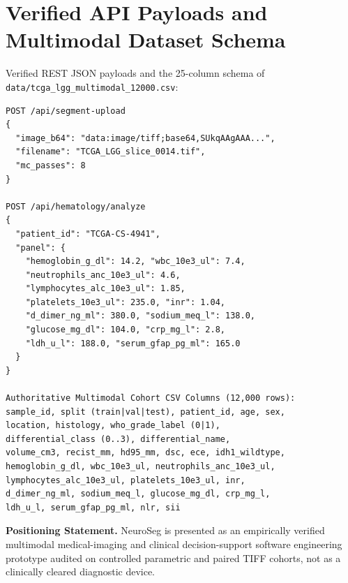\documentclass[journal,onecolumn,10pt]{IEEEtran}
\begin{document}
\section{Verified API Payloads and Multimodal Dataset Schema}
Verified REST JSON payloads and the 25-column schema of \texttt{data/tcga\_lgg\_multimodal\_12000.csv}:
\begin{verbatim}
POST /api/segment-upload
{
  "image_b64": "data:image/tiff;base64,SUkqAAgAAA...",
  "filename": "TCGA_LGG_slice_0014.tif",
  "mc_passes": 8
}

POST /api/hematology/analyze
{
  "patient_id": "TCGA-CS-4941",
  "panel": {
    "hemoglobin_g_dl": 14.2, "wbc_10e3_ul": 7.4,
    "neutrophils_anc_10e3_ul": 4.6,
    "lymphocytes_alc_10e3_ul": 1.85,
    "platelets_10e3_ul": 235.0, "inr": 1.04,
    "d_dimer_ng_ml": 380.0, "sodium_meq_l": 138.0,
    "glucose_mg_dl": 104.0, "crp_mg_l": 2.8,
    "ldh_u_l": 188.0, "serum_gfap_pg_ml": 165.0
  }
}

Authoritative Multimodal Cohort CSV Columns (12,000 rows):
sample_id, split (train|val|test), patient_id, age, sex,
location, histology, who_grade_label (0|1),
differential_class (0..3), differential_name,
volume_cm3, recist_mm, hd95_mm, dsc, ece, idh1_wildtype,
hemoglobin_g_dl, wbc_10e3_ul, neutrophils_anc_10e3_ul,
lymphocytes_alc_10e3_ul, platelets_10e3_ul, inr,
d_dimer_ng_ml, sodium_meq_l, glucose_mg_dl, crp_mg_l,
ldh_u_l, serum_gfap_pg_ml, nlr, sii
\end{verbatim}

\textbf{Positioning Statement.} NeuroSeg is presented as an empirically verified multimodal medical-imaging and clinical decision-support software engineering prototype audited on controlled parametric and paired TIFF cohorts, not as a clinically cleared diagnostic device.
\end{document}
